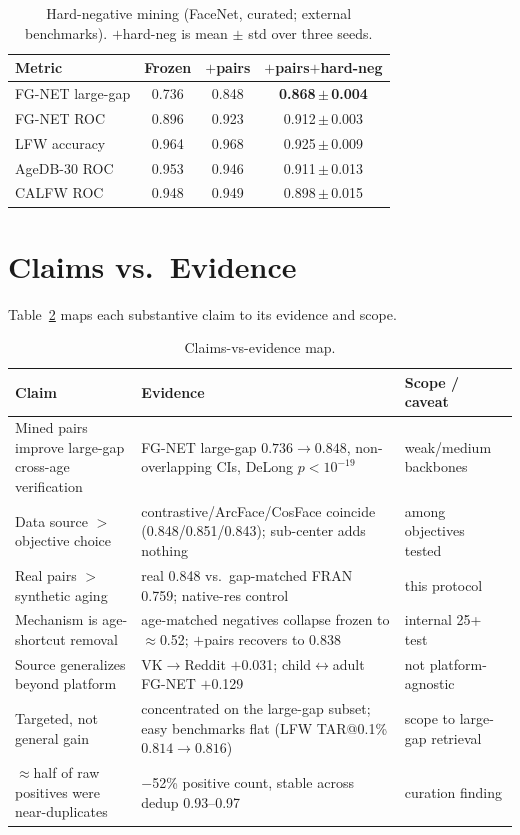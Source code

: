 \documentclass[letterpaper]{article} %
\begin{document}
\begin{table}[t]
\centering
\small
\begin{tabular}{@{}lccc@{}}
\toprule
Metric & Frozen & $+$pairs & $+$pairs$+$hard-neg \\
\midrule
FG-NET large-gap & 0.736 & 0.848 & \textbf{0.868\,$\pm$\,0.004} \\
FG-NET ROC & 0.896 & 0.923 & 0.912\,$\pm$\,0.003 \\
LFW accuracy & 0.964 & 0.968 & 0.925\,$\pm$\,0.009 \\
AgeDB-30 ROC & 0.953 & 0.946 & 0.911\,$\pm$\,0.013 \\
CALFW ROC & 0.948 & 0.949 & 0.898\,$\pm$\,0.015 \\
\bottomrule
\end{tabular}
\caption{Hard-negative mining (FaceNet, curated; external benchmarks). $+$hard-neg is mean $\pm$ std over three seeds.}
\label{tab:hardneg}
\end{table}

\section{Claims vs.\ Evidence}\label{sup:claims}
Table~\ref{tab:claims} maps each substantive claim to its evidence and scope.

\begin{table}[t]
\centering
\small
\begin{tabular}{@{}p{}p{}p{}@{}}
\toprule
Claim & Evidence & Scope / caveat \\
\midrule
Mined pairs improve large-gap cross-age verification & FG-NET large-gap $0.736\!\rightarrow\!0.848$, non-overlapping CIs, DeLong $p<10^{-19}$ & weak/medium backbones \\
Data source $>$ objective choice & contrastive/ArcFace/CosFace coincide (0.848/0.851/0.843); sub-center adds nothing & among objectives tested \\
Real pairs $>$ synthetic aging & real 0.848 vs.\ gap-matched FRAN 0.759; native-res control & this protocol \\
Mechanism is age-shortcut removal & age-matched negatives collapse frozen to $\approx$0.52; $+$pairs recovers to 0.838 & internal 25+ test \\
Source generalizes beyond platform & VK$\to$Reddit $+$0.031; child$\leftrightarrow$adult FG-NET $+$0.129 & not platform-agnostic \\
Targeted, not general gain & concentrated on the large-gap subset; easy benchmarks flat (LFW TAR@0.1\% $0.814\!\rightarrow\!0.816$) & scope to large-gap retrieval \\
$\approx$half of raw positives were near-duplicates & $-$52\% positive count, stable across dedup 0.93--0.97 & curation finding \\
\bottomrule
\end{tabular}
\caption{Claims-vs-evidence map.}
\label{tab:claims}
\end{table}
\end{document}

